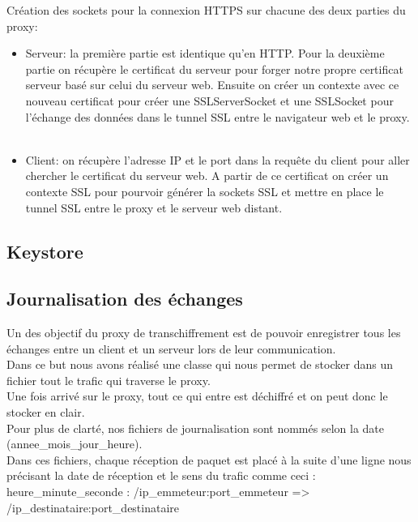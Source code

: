 \documentclass[a4paper,11pt,french]{report}
\begin{document}
Création des sockets pour la connexion HTTPS sur chacune des deux parties du proxy:
\begin{itemize}
  \item Serveur: la première partie est identique qu'en HTTP. Pour la deuxième 
  partie on récupère le certificat du serveur pour forger notre propre 
  certificat serveur basé sur celui du serveur web. Ensuite on créer un contexte 
  avec ce nouveau certificat pour créer une SSLServerSocket et une SSLSocket 
  pour l'échange des données dans le tunnel SSL entre le navigateur web et le 
  proxy. ~~\\
  
  \item Client: on récupère l'adresse IP et le port dans la requête du client 
  pour aller chercher le certificat du serveur web. A partir de ce certificat on 
  créer un contexte SSL pour pourvoir générer la sockets SSL et mettre en place 
  le tunnel SSL entre le proxy et le serveur web distant.
\end{itemize}

\subsection{Keystore}


\subsection{Journalisation des échanges}
Un des objectif du proxy de transchiffrement est de pouvoir enregistrer tous les 
échanges entre un client et un serveur lors de leur communication.~~\\
Dans ce but nous avons réalisé une classe qui nous permet de stocker dans un fichier tout le trafic qui traverse le proxy.~~\\

Une fois arrivé sur le proxy, tout ce qui entre est déchiffré et on peut donc le stocker en clair.~~\\

Pour plus de clarté, nos fichiers de journalisation sont nommés selon la date (annee\_mois\_jour\_heure).~~\\

Dans ces fichiers, chaque réception de paquet est placé à la suite d'une ligne nous précisant la date de réception et le sens du trafic comme ceci : ~~\\

heure\_minute\_seconde : /ip\_emmeteur:port\_emmeteur => /ip\_destinataire:port\_destinataire~~\\
\end{document}
